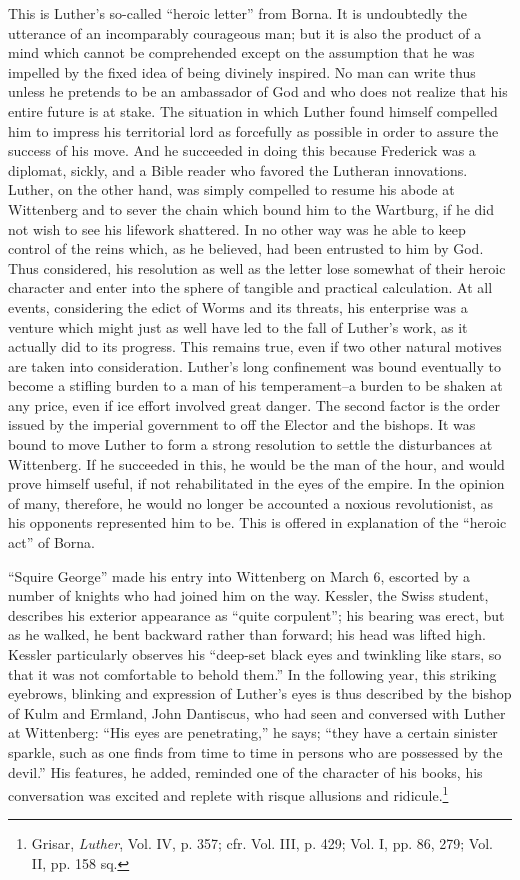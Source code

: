 This is Luther’s so-called “heroic letter” from Borna. It is undoubtedly
the utterance of an incomparably courageous man; but it
is also the product of a mind which cannot be comprehended except
on the assumption that he was impelled by the fixed idea of being
divinely inspired. No man can write thus unless he pretends to be an
ambassador of God and who does not realize that his entire future is
at stake. The situation in which Luther found himself compelled him
to impress his territorial lord as forcefully as possible in order to assure
the success of his move. And he succeeded in doing this because
Frederick was a diplomat, sickly, and a Bible reader who favored
the Lutheran innovations. Luther, on the other hand, was simply
compelled to resume his abode at Wittenberg and to sever the chain
which bound him to the Wartburg, if he did not wish to see his lifework
shattered. In no other way was he able to keep control of the
reins which, as he believed, had been entrusted to him by God.
Thus considered, his resolution as well as the letter lose somewhat
of their heroic character and enter into the sphere of tangible and practical
calculation. At all events, considering the edict of Worms and its
threats, his enterprise was a venture which might just as well
have led to the fall of Luther’s work, as it actually did to its progress.
This remains true, even if two other natural motives are taken into consideration.
Luther’s long confinement was bound eventually to become
a stifling burden to a man of his temperament--a burden to be shaken
at any price, even if ice effort involved great danger. The
second factor is the order issued by the imperial government to off
the Elector and the bishops. It was bound to move Luther to form a strong
resolution to settle the disturbances at Wittenberg. If he succeeded in
this, he would be the man of the hour, and would prove himself useful, if not
rehabilitated in the eyes of the empire. In the opinion of many,
therefore, he would no longer be accounted a noxious revolutionist,
as his opponents represented him to be. This is offered in explanation
of the “heroic act” of Borna.

“Squire George” made his entry into Wittenberg on March 6,
escorted by a number of knights who had joined him on the way.
Kessler, the Swiss student, describes his exterior appearance as “quite
corpulent”; his bearing was erect, but as he walked, he bent backward
rather than forward; his head was lifted high. Kessler particularly
observes his “deep-set black eyes and twinkling like stars, so that it was not
comfortable to behold them.”
In the following year, this striking eyebrows, blinking and
expression of Luther’s eyes is thus
described by the bishop of Kulm and Ermland, John Dantiscus, who
had seen and conversed with Luther at Wittenberg: “His eyes are
penetrating,” he says; “they have a certain sinister sparkle, such as
one finds from time to time in persons who are possessed by the
devil.” His features, he added, reminded one of the character of his
books, his conversation was excited and replete with risque allusions
and ridicule.\footnote
{Grisar, \textit{Luther}, Vol. IV, p. 357; cfr. Vol. III, p. 429; Vol. I, pp. 86, 279; Vol. II,
pp. 158 sq.}

